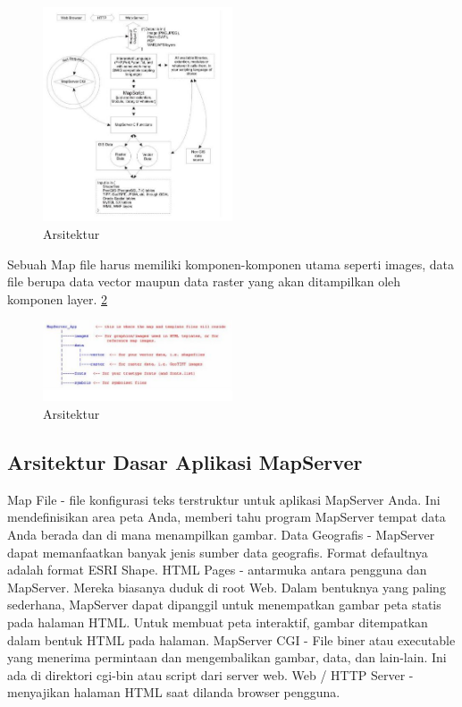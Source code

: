 \begin{figure}[ht]
	    \centerline{\includegraphics[width=0.50\textwidth]{figures/gambar7.JPG}}
	    \caption{Arsitektur}
		\label{gambar7}
		\end{figure}
		
Sebuah Map file harus memiliki komponen-komponen utama seperti images, data file berupa data vector maupun data raster yang akan ditampilkan oleh komponen layer. \ref{gambar8}

\begin{figure}[ht]
	    \centerline{\includegraphics[width=0.50\textwidth]{figures/gambar8.JPG}}
	    \caption{Arsitektur}
		\label{gambar8}
		\end{figure}

\subsection{Arsitektur Dasar Aplikasi MapServer}
Map File - file konfigurasi teks terstruktur untuk aplikasi MapServer Anda. Ini mendefinisikan area peta Anda, memberi tahu program MapServer tempat data Anda berada dan di mana menampilkan gambar.
Data Geografis - MapServer dapat memanfaatkan banyak jenis sumber data geografis. Format defaultnya adalah format ESRI Shape.
HTML Pages - antarmuka antara pengguna dan MapServer. Mereka biasanya duduk di root Web. Dalam bentuknya yang paling sederhana, MapServer dapat dipanggil untuk menempatkan gambar peta statis pada halaman HTML. Untuk membuat peta interaktif, gambar ditempatkan dalam bentuk HTML pada halaman.
MapServer CGI - File biner atau executable yang menerima permintaan dan mengembalikan gambar, data, dan lain-lain. Ini ada di direktori cgi-bin atau script dari server web.
Web / HTTP Server - menyajikan halaman HTML saat dilanda browser pengguna.

